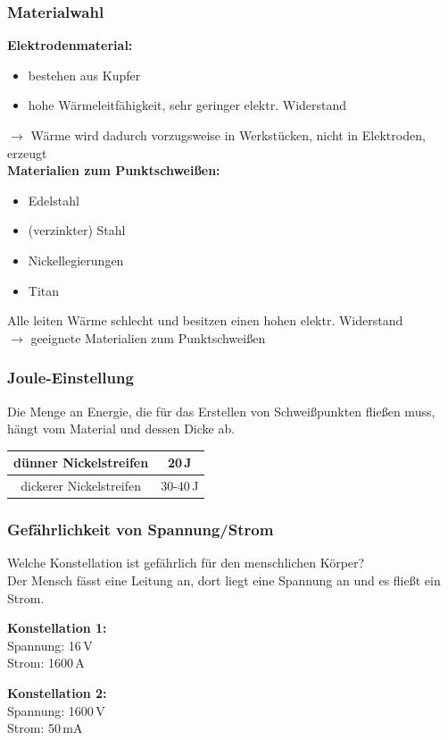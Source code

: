 \documentclass[handout, usenames,dvipsnames, nosymbols,aspectratio=169]{beamer}
\begin{document}
	\begin{frame}
		\frametitle{Materialwahl}
		\textbf{Elektrodenmaterial:}
		\begin{itemize}
			\item bestehen aus Kupfer
			\item hohe Wärmeleitfähigkeit, sehr geringer elektr. Widerstand
		\end{itemize}
		$\rightarrow$ Wärme wird dadurch vorzugsweise in Werkstücken, nicht in Elektroden, erzeugt
		\\[1em]
		\onslide<3->\textbf{Materialien zum Punktschweißen:}
		\begin{itemize}
			\item Edelstahl
			\onslide<3->\item (verzinkter) Stahl
			\onslide<3->\item Nickellegierungen
			\onslide<3->\item Titan
		\end{itemize}
		Alle leiten Wärme schlecht und besitzen einen hohen elektr. Widerstand\\
		\onslide<4->$\rightarrow$ geeignete Materialien zum Punktschweißen
	\end{frame}
	
	\begin{frame}
		\frametitle{Joule-Einstellung}
		Die Menge an Energie, die für das Erstellen von Schweißpunkten fließen muss, hängt vom Material und dessen Dicke ab.\\[2em]
		\begin{center}
		\begin{tabular}{| c | c|}
			
			\hline
			dünner Nickelstreifen & 20\,J \\ 
			\hline
			dickerer Nickelstreifen & 30-40\,J \\  
			\hline 
		\end{tabular}
		\end{center}
	\end{frame}
	
	\begin{frame}%
		\frametitle{Gefährlichkeit von Spannung/Strom}
		Welche Konstellation ist gefährlich für den menschlichen Körper?\\[1em]
		Der Mensch fässt eine Leitung an, dort liegt eine Spannung an und es fließt ein Strom.\\[1em]
		\hfill
		\begin{minipage}{0.4\textwidth}
			\textbf{Konstellation 1:}\\
			Spannung: 16\,V\\
			Strom: 1600\,A\\
		\end{minipage}
		\hspace{2em}
		\begin{minipage}{0.4\textwidth}
			\textbf{Konstellation 2:}\\
			Spannung: 1600\,V\\
			Strom: 50\,mA\\
		\end{minipage}
	\end{frame}
	
\end{document}
